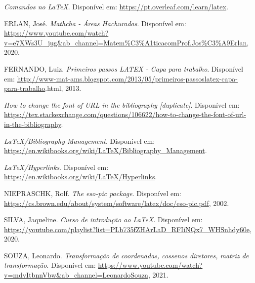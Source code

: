 \documentclass[12pt,a4paper]{article}
\begin{document}


\begin{thebibliography}{99}
     
        \textit {Comandos no LaTeX}.
        Disponível em: \url{https://pt.overleaf.com/learn/latex}.
           
        ERLAN, José. 
        \textit {Mathcha - Áreas Hachuradas}.
        Disponível em: \url{https://www.youtube.com/watch?v=e7XWs3U_jug&ab_channel=Matem%C3%A1ticacomProf.Jos%C3%A9Erlan},
        2020.
        
        FERNANDO, Luiz. 
        \textit {Primeiros passos LATEX - Capa para trabalho}.
        Disponível em: \url{http://www-mat-ams.blogspot.com/2013/05/primeiros-passoslatex-capa-para-trabalho}.html,
        2013.
      
        \textit {How to change the font of URL in the bibliography [duplicate]}.
        Disponível em: \url{https://tex.stackexchange.com/questions/106622/how-to-change-the-font-of-url-in-the-bibliography}.

        \textit {LaTeX/Bibliography Management}.
        Disponível em: \url{https://en.wikibooks.org/wiki/LaTeX/Bibliography_Management}.
        
        \textit {LaTeX/Hyperlinks}.
        Disponível em: \url{https://en.wikibooks.org/wiki/LaTeX/Hyperlinks}.
              
        NIEPRASCHK, Rolf.
        \textit {The eso-pic package}.
        Disponível em: \url{https://cs.brown.edu/about/system/software/latex/doc/eso-pic.pdf},
        2002.
        
        SILVA, Jaqueline. 
        \textit {Curso de introdução ao LaTeX}.
        Disponível em: \url{https://youtube.com/playlist?list=PLb735fZHArLaD_RFIiNQx7_WHSnhdy60e},
        2020.

        SOUZA, Leonardo. 
        \textit {Transformação de coordenadas, cossenos diretores, matriz de transformação}.
        Disponível em: \url{https://www.youtube.com/watch?v=mdvItbnnVbw&ab_channel=LeonardoSouza},
        2021.

\end{thebibliography}

\end{document}
